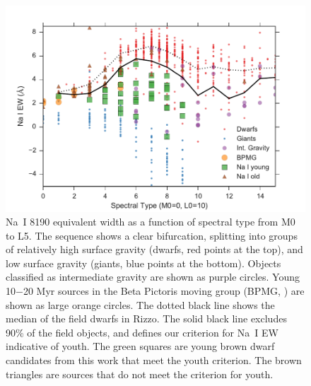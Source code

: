 \begin{figure}[ht!]
  \caption[Na~I 8190 equivalent width as a function of spectral type from M0 to L5]{Na~I 8190 equivalent width as a function of spectral type from M0 to L5.  The sequence shows a clear bifurcation, splitting into groups of relatively high surface gravity (dwarfs, red points at the top), and low surface gravity (giants, blue points at the bottom).  Objects classified as intermediate gravity \citep{2009AJ....137.3345C} are shown as purple circles.  Young 10$-$20 Myr sources in the Beta Pictoris moving group (BPMG, \citet{2012AJ....143..114S}) are shown as large orange circles.  The dotted black line shows the median of the field dwarfs in Rizzo.  The solid black line excludes 90\% of the field objects, and defines our criterion for Na~I EW indicative of youth.  The green squares are young brown dwarf candidates from this work that meet the youth criterion.  The brown triangles are sources that do not meet the criterion for youth.\label{fig_NaI_EW} }
\centering
\includegraphics[scale=0.6]{chIMACS/figures/NaI_EW}
\end{figure}


